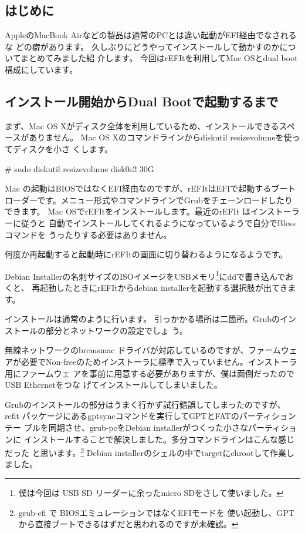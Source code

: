 \documentclass[mingoth,a4paper]{jsarticle}
\begin{document}
\subsection{はじめに}

AppleのMacBook Airなどの製品は通常のPCとは違い起動がEFI経由でなされるな
どの癖があります。
久しぶりにどうやってインストールして動かすのかについてまとめてみました紹
介します。
今回はrEFIt\cite{refit}を利用してMac OSとdual boot 構成にしています。

\subsection{インストール開始からDual Bootで起動するまで}

まず、Mac OS Xがディスク全体を利用しているため、インストールできるスペースがありません。
Mac OS Xのコマンドラインからdiskutil resizevolumeを使ってディスクを小さ
くします。

\begin{commandline}
 # sudo diskutil resizevolume disk0s2 30G 
\end{commandline}

Mac の起動はBIOSではなくEFI経由なのですが、rEFItはEFIで起動するブートローダーです。メニュー形式やコマンドラインでGrubをチェーンロードしたりできます。
Mac OSでrEFItをインストールします。最近のrEFIt はインストーラーに従うと
自動でインストールしてくれるようになっているようで自分でBlessコマンドを
うったりする必要はありません。

何度か再起動すると起動時にrEFItの画面に切り替わるようになるようです。

Debian Installerの名刺サイズのISOイメージをUSBメモリ\footnote{僕は今回は
USB SD リーダーに余ったmicro SDをさして使いました。}にddで書き込んでおくと、
再起動したときにrEFItからdebian installerを起動する選択肢が出てきます。

インストールは通常のように行います。
引っかかる場所は二箇所。Grubのインストールの部分とネットワークの設定でしょ
う。

無線ネットワークのbrcmsmac ドライバが対応しているのですが、ファームウェ
アが必要でNon-freeのためインストーラに標準で入っていません。インストーラ用にファームウェ
アを事前に用意する必要がありますが、僕は面倒だったのでUSB Ethernetをつな
げてインストールしてしまいました。

Grubのインストールの部分はうまく行かず試行錯誤してしまったのですが、
refit パッケージにあるgptsyncコマンドを実行してGPTとFATのパーティションテー
ブルを同期させ、grub-pcをDebian installerがつくった小さなパーティションに
インストールすることで解決しました。多分コマンドラインはこんな感じだった
と思います。\footnote{grub-efi で BIOSエミュレーションではなくEFIモードを
使い起動し、GPTから直接ブートできるはずだと思われるのですが未確認。}
Debian installerのシェルの中でtargetにchrootして作業しました。
\end{document}
